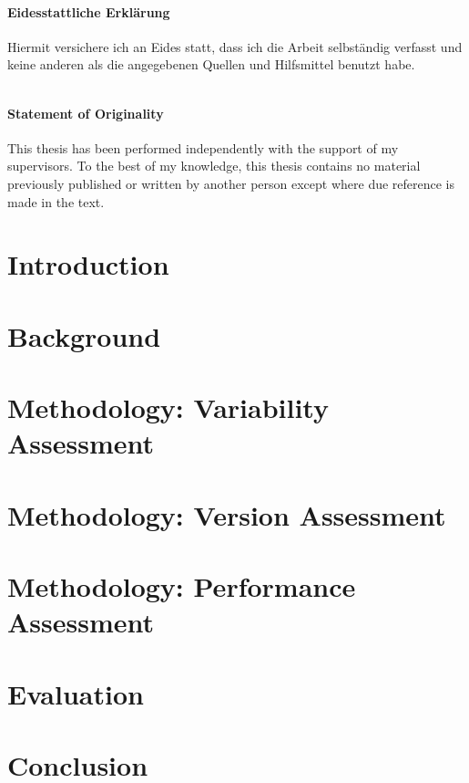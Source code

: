 \documentclass[
	12pt,
	a4paper,
	oneside,
	openright
]{scrbook}
\begin{document}

\newpage
\thispagestyle{empty}


 $$\qquad$$
 $$\qquad$$
 $$\qquad$$
  $$\qquad$$
 $$\qquad$$
 $$\qquad$$
 
\subsubsection*{Eidesstattliche Erklärung}
 Hiermit versichere ich an Eides statt, dass ich die Arbeit selbständig verfasst
 und keine anderen als die angegebenen Quellen und Hilfsmittel benutzt habe.

\vspace{1.3cm}

 $$\qquad$$
 $$\qquad$$
 $$\qquad$$
\subsubsection*{Statement of Originality}
This thesis has been performed independently with the support of my
supervisors. To the best of my knowledge, this thesis contains no material previously published or written
by another person except where due reference is made in the text.

\vspace{1.3cm}


\tableofcontents

\chapter{Introduction}\label{chapter:1}
\setcounter{page}{1}


\chapter{Background}\label{chapter:2}


\chapter{Methodology: Variability Assessment}


\chapter{Methodology: Version Assessment}


\chapter{Methodology: Performance Assessment}


\chapter{Evaluation}

\chapter{Conclusion}

\clearpage


\end{document}
